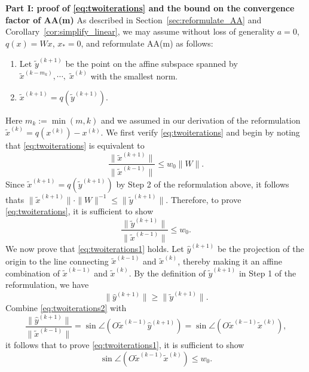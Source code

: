 \documentclass[11pt]{article}
\begin{document}
\textbf{Part I: proof of \eqref{eq:twoiterations} and the bound on the convergence factor of AA(m)} As described in Section~\ref{sec:reformulate_AA} and Corollary~\ref{cor:simplify_linear}, we may assume without loss of generality ${a}={0}$, $q(x)=Wx$,  ${x}_* = {0}$, and reformulate AA(m) as follows: %
\begin{enumerate}
\item Let $\widetilde{y}^{(k+1)}$ be the point on the affine subspace spanned by $\widetilde{x}^{(k-m_k)}, \cdots, \; \widetilde{x}^{(k)}$ with the smallest norm.

\item  $\widetilde{x}^{(k+1)}
=q(\widetilde{y}^{(k+1)})$.
\end{enumerate}
Here $m_k:=\min(m,k)$ and we assumed in our derivation of the reformulation $\widetilde{x}^{(k)}=q(x^{(k)})-x^{(k)}$. We first verify \eqref{eq:twoiterations} and begin by noting that \eqref{eq:twoiterations} is equivalent to
\[
\frac{\|\widetilde{x}^{(k+1)}\|}{\|\widetilde{x}^{(k-1)}\|}\leq w_0 \|W\|.
\]
Since $\widetilde{x}^{(k+1)} 
=q(\widetilde{y}^{(k+1)})$ by Step 2 of the reformulation above, it follows thats
$
\|\widetilde{x}^{(k+1)}\|\cdot \|W\|^{-1} \leq \|\widetilde{y}^{(k+1)}\|.
$
Therefore, to prove \eqref{eq:twoiterations}, it is sufficient to show 
 \begin{equation}\label{eq:twoiterations1}
\frac{\|\widetilde{y}^{(k+1)}\|}{\|\widetilde{x}^{(k-1)}\|}\leq w_0.
 \end{equation}
We now prove that  \eqref{eq:twoiterations1} holds. Let $\widehat{y}^{(k+1)}$ be the projection of the origin to the line connecting $\widetilde{x}^{(k-1)}$ and $\widetilde{x}^{(k)}$, thereby making it an affine combination of $\widetilde{x}^{(k-1)}$ and $\widetilde{x}^{(k)}$. By the definition of $\widetilde{y}^{(k+1)}$ in Step 1 of the reformulation, we have
\begin{equation}\label{eq:twoiterations2}
\|\widehat{y}^{(k+1)}\|\geq \|\widetilde{y}^{(k+1)}\|.
\end{equation}
Combine \eqref{eq:twoiterations2} with
\begin{equation*}
\frac{\|\widehat{y}^{(k+1)}\|}{\|\widetilde{x}^{(k-1)}\|}=\sin\angle(O \widetilde{x}^{(k-1)} \widehat{y}^{(k+1)})=\sin\angle(O\widetilde{x}^{(k-1)}\widetilde{x}^{(k)}),
\end{equation*}
it follows that to prove   \eqref{eq:twoiterations1}, it is sufficient to show \begin{equation}\label{eq:twoiterations3}\sin\angle(O\widetilde{x}^{(k-1)}\widetilde{x}^{(k)}) \leq w_0.\end{equation} 
\end{document}
